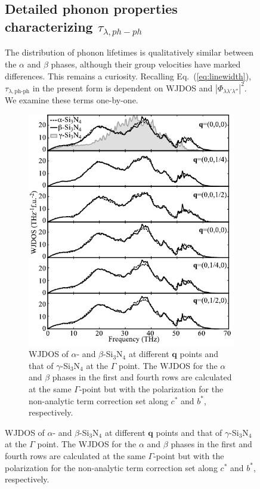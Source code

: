 \documentclass[twocolumn,amsmath,amssymb,a4paper,prb,superscriptaddress,floatfix]{revtex4-1}
\begin{document}
\begin{figure}[h]
\subsection{Detailed phonon properties characterizing $\tau_{\lambda,ph-ph}$}

The distribution of phonon lifetimes is qualitatively similar between the $\alpha$ and
$\beta$ phases, although their group velocities have marked differences. This
remains a curiosity. 
Recalling Eq.~(\ref{eq:linewidth}), $\tau_{\lambda,\text{ph-ph}}$ in the
present form is dependent on WJDOS
and $|\Phi_{\lambda\lambda'\lambda''}|^2$. We examine these terms one-by-one.

\begin{figure}[ht]
 \centering
  \includegraphics[width=0.9\linewidth]{figure_wjdoss_gray.pdf} \caption{
	  WJDOS of $\alpha$- and $\beta$-Si$_3$N$_4$ at different $\mathbf
	  q$ points and that of $\gamma$-Si$_3$N$_4$ at the $\Gamma$ point. 
  The WJDOS for the $\alpha$ and $\beta$ phases in the  first and fourth rows
  are calculated at the same $\Gamma$-point but 
  with the polarization for the non-analytic term correction set along $c^*$ and
  $b^*$, respectively. \label{fig:Fig6_338} }
 \centering
\end{figure}


\end{figure}
\end{document}
